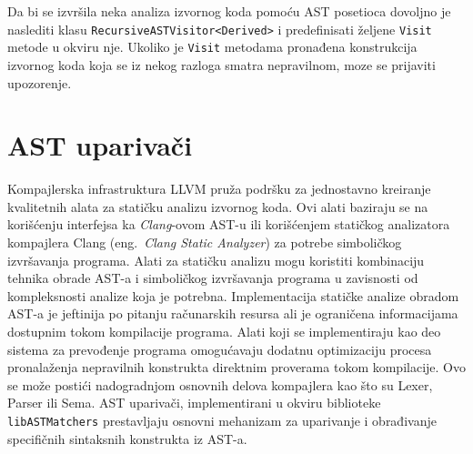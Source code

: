 \documentclass[12pt,oneside]{memoir}
\begin{document}
\par
Da bi se izvršila neka analiza izvornog koda pomoću AST posetioca dovoljno je naslediti klasu 
 \texttt{RecursiveASTVisitor<Derived>} i predefinisati željene \texttt{Visit} metode u okviru nje. Ukoliko je \texttt{Visit} metodama pronađena konstrukcija izvornog koda koja se iz nekog razloga smatra nepravilnom, moze se prijaviti upozorenje.

\section{AST upariva\v{c}i}

Kompajlerska infrastruktura LLVM pru\v{z}a podr\v{s}ku za jednostavno kreiranje kvalitetnih alata za stati\v{c}ku analizu izvornog koda. Ovi alati
baziraju se na kori\v{s}\'{c}enju interfejsa ka \textit{Clang}-ovom AST-u ili kori\v{s}\'{c}enjem stati\v{c}kog analizatora kompajlera Clang (eng.~\textit{Clang Static Analyzer}) za potrebe simboli\v{c}kog izvr\v{s}avanja programa. Alati za stati\v{c}ku analizu mogu koristiti kombinaciju tehnika obrade AST-a i simboli\v{c}kog izvr\v{s}avanja programa u zavisnosti od kompleksnosti analize koja je potrebna. Implementacija stati\v{c}ke analize obradom AST-a je jeftinija po pitanju ra\v{c}unarskih resursa ali je ograni\v{c}ena informacijama dostupnim tokom kompilacije programa. Alati koji se implementiraju kao deo sistema za prevođenje programa omogu\'{c}avaju dodatnu optimizaciju procesa pronala\v{z}enja nepravilnih konstrukta direktnim proverama tokom kompilacije. Ovo se mo\v{z}e posti\'{c}i nadogradnjom osnovnih delova kompajlera kao \v{s}to su Lexer, Parser ili Sema. AST upariva\v{c}i, implementirani u okviru biblioteke \texttt{libASTMatchers} prestavljaju osnovni mehanizam za uparivanje i obrađivanje specifi\v{c}nih sintaksnih konstrukta iz AST-a.


\newtheorem{primer}{Primer}[section]
\end{document}
